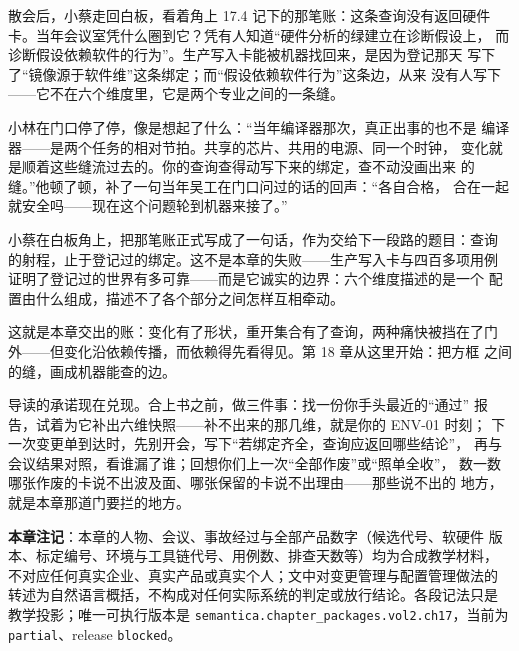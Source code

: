 散会后，小蔡走回白板，看着角上 17.4 记下的那笔账：这条查询没有返回硬件
卡。当年会议室凭什么圈到它？凭有人知道“硬件分析的绿建立在诊断假设上，
而诊断假设依赖软件的行为”。生产写入卡能被机器找回来，是因为登记那天
写下了“镜像源于软件维”这条绑定；而“假设依赖软件行为”这条边，从来
没有人写下——它不在六个维度里，它是两个专业之间的一条缝。

小林在门口停了停，像是想起了什么：“当年编译器那次，真正出事的也不是
编译器——是两个任务的相对节拍。共享的芯片、共用的电源、同一个时钟，
变化就是顺着这些缝流过去的。你的查询查得动写下来的绑定，查不动没画出来
的缝。”他顿了顿，补了一句当年吴工在门口问过的话的回声：“各自合格，
合在一起就安全吗——现在这个问题轮到机器来接了。”

小蔡在白板角上，把那笔账正式写成了一句话，作为交给下一段路的题目：查询
的射程，止于登记过的绑定。这不是本章的失败——生产写入卡与四百多项用例
证明了登记过的世界有多可靠——而是它诚实的边界：六个维度描述的是一个
配置由什么组成，描述不了各个部分之间怎样互相牵动。

这就是本章交出的账：变化有了形状，重开集合有了查询，两种痛快被挡在了门
外——但变化沿依赖传播，而依赖得先看得见。第 18 章从这里开始：把方框
之间的缝，画成机器能查的边。

导读的承诺现在兑现。合上书之前，做三件事：找一份你手头最近的“通过”
报告，试着为它补出六维快照——补不出来的那几维，就是你的 ENV-01 时刻；
下一次变更单到达时，先别开会，写下“若绑定齐全，查询应返回哪些结论”，
再与会议结果对照，看谁漏了谁；回想你们上一次“全部作废”或“照单全收”，
数一数哪张作废的卡说不出波及面、哪张保留的卡说不出理由——那些说不出的
地方，就是本章那道门要拦的地方。


\begin{noteblock}
\textbf{本章注记}：本章的人物、会议、事故经过与全部产品数字（候选代号、软硬件
版本、标定编号、环境与工具链代号、用例数、排查天数等）均为合成教学材料，
不对应任何真实企业、真实产品或真实个人；文中对变更管理与配置管理做法的
转述为自然语言概括，不构成对任何实际系统的判定或放行结论。各段记法只是
教学投影；唯一可执行版本是 \nolinkurl{semantica.chapter_packages.vol2.ch17}，当前为
\nolinkurl{partial}、release \nolinkurl{blocked}。
\end{noteblock}
